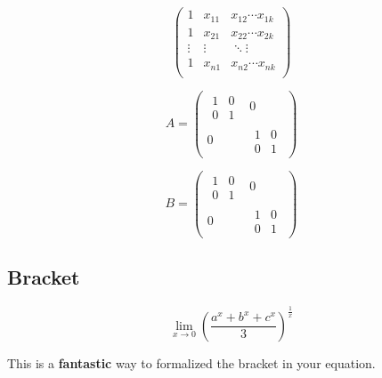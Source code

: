 \documentclass[11pt]{article}
\begin{document}
        $$
        \begin{pmatrix}
            1 & x_{11} & x_{12} \cdots x_{1k}\\
            1 & x_{21} & x_{22} \cdots x_{2k}\\
            \vdots & \vdots & \ddots \vdots\\
            1 & x_{n1} & x_{n2} \cdots x_{nk}\\
            
        \end{pmatrix}
        $$
        $$$$

        $$
        A = 
        \begin{pmatrix}
            \begin{matrix}
                1 & 0\\
                0 & 1
            \end{matrix}
            & 0 \\
            0 & 
            \begin{matrix}
                1 & 0\\
                0 & 1
            \end{matrix}
        \end{pmatrix}
        $$


        $$
        B = 
        \begin{pmatrix}
            \begin{matrix}
                1 & 0\\
                0 & 1
            \end{matrix}
            & 0\\
            0 &
            \begin{matrix}
                1 & 0\\
                0 & 1
            \end{matrix}
        \end{pmatrix}
        $$


        \subsection{Bracket}

        $$
        \lim_{x \to 0} \left(\frac{a^x + b^x + c^x}{3} \right)^\frac1x
        $$

        This is a \textbf{fantastic} way to formalized the bracket in your equation.
\end{document}
